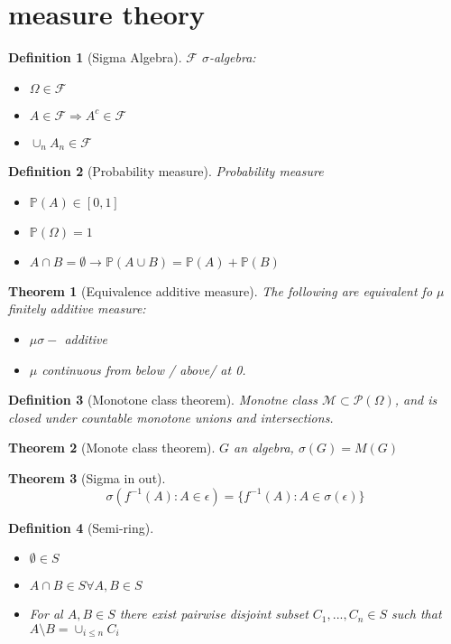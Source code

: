 \documentclass{article}
\newtheorem{theorem}{Theorem}
\newtheorem{definition}{Definition}
\begin{document}
\section{measure theory}
  
\begin{definition}[Sigma Algebra]
  $\mathcal F$ $\sigma$-algebra:
  \begin{itemize}
  \item $\Omega \in \mathcal F$
  \item $A \in \mathcal F \Rightarrow A^c \in \mathcal F$
  \item $\cup_n A_n \in \mathcal F$
  \end{itemize}
\end{definition}
\begin{definition}[Probability measure]
  Probability measure
  \begin{itemize}
  \item $\mathbb P(A) \in [0, 1]$
  \item $\mathbb P(\Omega) = 1$
  \item $A \cap B = \emptyset \rightarrow \mathbb P(A \cup B) = \mathbb P(A) + \mathbb P(B)$
  \end{itemize}
\end{definition}
\begin{theorem}[Equivalence additive measure]
  The following are equivalent fo $\mu$ finitely additive measure:
  \begin{itemize}
  \item $\mu \sigma-$ additive
  \item $\mu$ continuous from below / above/ at 0.
  \end{itemize}
\end{theorem}
\begin{definition}[Monotone class theorem]
  Monotne class $\mathcal M \subset \mathcal P(\Omega)$,  and is closed under countable monotone unions and intersections.
\end{definition}
\begin{theorem}[Monote class theorem]
  $G$ an algebra, $\sigma(G) = M(G)$
\end{theorem}
\begin{theorem}[Sigma in out]
  $$\sigma(f^{-1}(A): A \in \epsilon) = \{ f^{-1}(A): A \in \sigma(\epsilon) \}$$
\end{theorem}
\begin{definition}[Semi-ring]
  \begin{itemize}
  \item $\emptyset \in S$
  \item $A \cap B \in S \forall A, B \in S$
  \item For al $A, B \in S$ there exist pairwise disjoint subset $C_1, ..., C_n \in S$ such that $A \setminus B = \cup_{i \le n} C_i$
  \end{itemize}
\end{definition}
\end{document}
